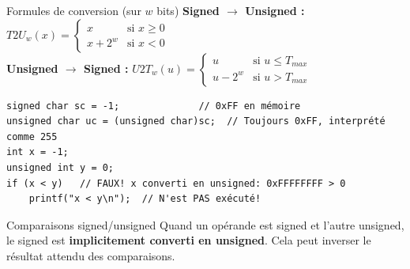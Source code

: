 \documentclass[10pt,a4paper]{article}
\begin{document}
\begin{techbox}{Formules de conversion (sur $w$ bits)}
\textbf{Signed $\rightarrow$ Unsigned :} $T2U_w(x) = \begin{cases} x & \text{si } x \geq 0 \\ x + 2^w & \text{si } x < 0 \end{cases}$\\[0.3em]
\textbf{Unsigned $\rightarrow$ Signed :} $U2T_w(u) = \begin{cases} u & \text{si } u \leq T_{max} \\ u - 2^w & \text{si } u > T_{max} \end{cases}$
\end{techbox}

\begin{lstlisting}[caption={Conversions en C}]
signed char sc = -1;              // 0xFF en mémoire
unsigned char uc = (unsigned char)sc;  // Toujours 0xFF, interprété comme 255
int x = -1;
unsigned int y = 0;
if (x < y)   // FAUX! x converti en unsigned: 0xFFFFFFFF > 0
    printf("x < y\n");  // N'est PAS exécuté!
\end{lstlisting}

\begin{warningbox}{Comparaisons signed/unsigned}
Quand un opérande est signed et l'autre unsigned, le signed est \textbf{implicitement converti en unsigned}. Cela peut inverser le résultat attendu des comparaisons.
\end{warningbox}

\begin{center}
\end{center}
\end{document}
